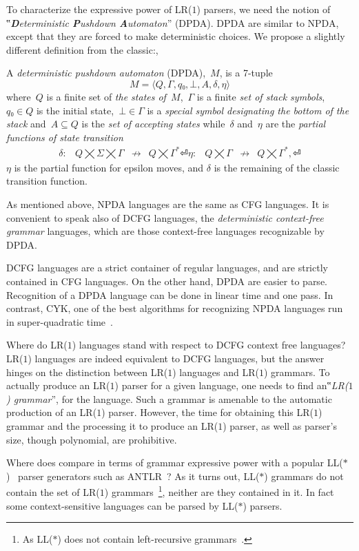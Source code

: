 To characterize the expressive power of LR($1$) parsers, we need the notion
of ‟\emph{\textbf Deterministic \textbf Pushdown \textbf Automaton}” (DPDA).
DPDA are similar to NPDA, except that they are forced
  to make deterministic choices.
We propose a slightly different definition from the classic:,
\begin{Definition}
  \label{Definition:DPDA}
  A \emph{deterministic pushdown automaton} (DPDA),~$M$, is a 7-tuple
  \[
    M =⟨Q,Γ, q₀,⊥, A,δ,η⟩
  \]
  where~$Q$ is a finite set of
  \emph{the states of~$M$},~$Γ$ is a finite
  \emph{set of stack symbols},~$q₀∈Q$ is the initial state,~$⊥∈Γ$
  is a \emph{special symbol designating the bottom of the stack}
  and~$A⊆Q$ is the \emph{set of accepting states} while~$δ$ and~$η$ are
  the \emph{partial functions of state transition}
  \[
    \begin{array}{crlc}
      δ: & Q⨉Σ⨉Γ &↛& Q⨉Γ^*⏎
      η: & Q⨉Γ &↛& Q⨉Γ^*,⏎
    \end{array}
  \]
  $η$ is the partial function for epsilon moves, and $δ$ is the remaining of the classic transition function.
\end{Definition}

As mentioned above, NPDA languages are the same as CFG languages.
It is convenient to speak also of DCFG languages, the \emph{deterministic context-free grammar} languages,
  which are those context-free languages recognizable by DPDA.

DCFG languages are a strict container of regular languages, 
  and are strictly contained in CFG languages.
  On the other hand, DPDA are easier to parse.
Recognition of a DPDA language can be done in linear time and one pass.
  In contrast, CYK, one of the best algorithms for recognizing NPDA languages run in super-quadratic time~\cite{Younger:1967,Cocke:1969,Earley:1970}.

Where do LR($1$) languages stand with respect to DCFG context free languages?
LR($1$) languages are indeed equivalent to DCFG languages, but
the answer hinges on the distinction
  between LR($1$) languages and LR($1$) grammars.
To actually produce an LR($1$) parser for a given language,
  one needs to find an‟\emph{LR($1$) grammar}”, for the language.
Such a grammar is amenable to
  the automatic production of an LR($1$) parser.
However, the time for obtaining this LR($1$) grammar and the processing it to produce an LR($1$) parser,
  as well as parser's size,
  though polynomial, are prohibitive.

Where does \Self compare in terms of grammar expressive power with a popular LL($*$)~\cite{Parr:2011} parser generators such %
  as ANTLR~\cite{Parr:1995}?
  As it turns out, LL($*$) grammars do not contain the set of LR($1$) grammars~\footnote{As LL($*$) does not contain left-recursive grammars~\cite{Parr:2011}.}, 
neither are they contained in it. 
  In fact some context-sensitive languages can be parsed by LL($*$) parsers.